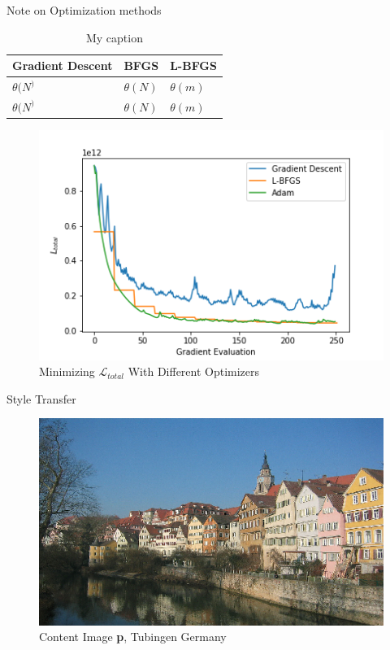 \documentclass{beamer}
\begin{document}
\begin{frame}[allowframebreaks]{Note on Optimization methods}
    \begin{table}[]
        \centering
        \caption{My caption}
        \label{my-label}
        \begin{tabular}{l|l|l}
            Gradient Descent              & BFGS        & L-BFGS      \\ \hline
            $\theta(N^)$ & $\theta(N)$ & $\theta(m)$ \\
            $\theta(N^)$ & $\theta(N)$ & $\theta(m)$
        \end{tabular}
    \end{table}

    \begin{figure}
    \centering
    \caption*{Minimizing $\mathcal{L}_{total}$ With Different Optimizers}
    \includegraphics[width=.8\textwidth]{img/loss/plot}
    \end{figure}

\end{frame}



\begin{frame}{Style Transfer}
\begin{figure}[H]
\centering
\includegraphics[width=.8\textwidth]{img/content/tubingen}
\caption*{Content Image \textbf{p}, Tubingen Germany}
\end{figure}
\end{frame}
\end{document}
